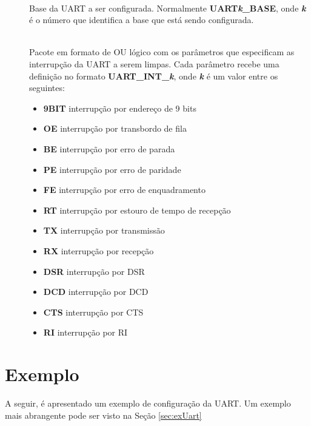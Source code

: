 \begin{description}
	\item []\hfill \\
	Base da UART a ser configurada. Normalmente \textbf{UART\emph{k}\_BASE}, onde \textbf{\emph{k}} é o número que identifica a base que está sendo configurada.
	
	\item []\hfill \\
	Pacote em formato de OU lógico com os parâmetros que especificam as interrupção da UART a serem limpas. Cada parâmetro recebe uma definição no formato \textbf{UART\_INT\_\emph{k}}, onde \textbf{\emph{k}} é um valor entre os seguintes:
	\begin{itemize}
		\item \textbf{9BIT} interrupção por endereço de 9 bits
		\item \textbf{OE} interrupção por transbordo de fila
		\item \textbf{BE} interrupção por erro de parada
		\item \textbf{PE} interrupção por erro de paridade
		\item \textbf{FE} interrupção por erro de enquadramento
		\item \textbf{RT} interrupção por estouro de tempo de recepção
		\item \textbf{TX} interrupção por transmissão
		\item \textbf{RX} interrupção por recepção
		\item \textbf{DSR} interrupção por DSR
		\item \textbf{DCD} interrupção por DCD
		\item \textbf{CTS} interrupção por CTS
		\item \textbf{RI} interrupção por RI
	\end{itemize}
\end{description}

\section{Exemplo}

A seguir, é apresentado um exemplo de configuração da UART. Um exemplo mais abrangente pode ser visto na Seção \ref{sec:exUart}

